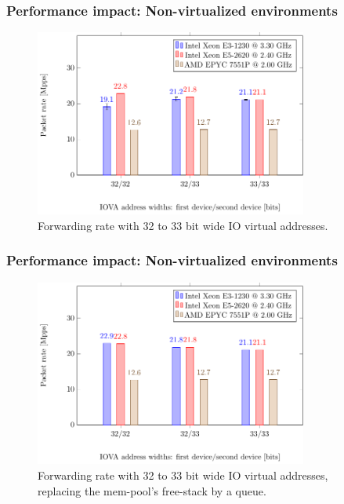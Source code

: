 \begin{frame}
    \frametitle{Performance impact: Non-virtualized environments}

    \begin{figure}
        \centering
        \includegraphics[width=0.8\textwidth,clip]{figures/iova-32-33-bit.pdf}
        \caption{Forwarding rate with 32 to 33 bit wide IO virtual addresses.}
    \end{figure}
\end{frame}

\begin{frame}
    \frametitle{Performance impact: Non-virtualized environments}

    \begin{figure}
        \centering
        \includegraphics[width=0.8\textwidth,clip]{figures/iova-32-33-bit-queue.pdf}
        \caption{Forwarding rate with 32 to 33 bit wide IO virtual addresses,\\
        replacing the mem-pool's free-stack by a queue.}
    \end{figure}
\end{frame}

